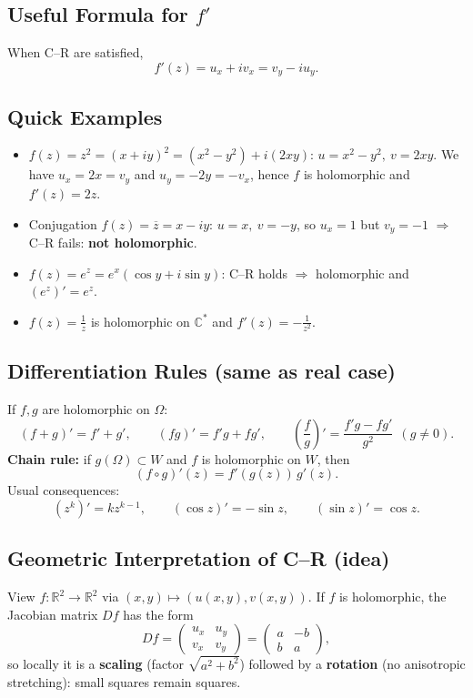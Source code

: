\subsection{Useful Formula for $f'$}
When C--R are satisfied,
\[
\boxed{f'(z)=u_x+iv_x=v_y-iu_y.}
\]

\subsection{Quick Examples}
\begin{itemize}
\item $f(z)=z^2=(x+iy)^2=(x^2-y^2)+i(2xy)$:
$u=x^2-y^2,\ v=2xy$.
We have $u_x=2x=v_y$ and $u_y=-2y=-v_x$, hence $f$ is holomorphic and $f'(z)=2z$.
\item Conjugation $f(z)=\overline{z}=x-iy$:
$u=x,\ v=-y$, so $u_x=1$ but $v_y=-1$ $\Rightarrow$ C--R fails:
\textbf{not holomorphic}.
\item $f(z)=e^z=e^x(\cos y+i\sin y)$: C--R holds $\Rightarrow$ holomorphic and $(e^z)'=e^z$.
\item $f(z)=\frac{1}{z}$ is holomorphic on $\mathbb{C}^\ast$ and $f'(z)=-\frac{1}{z^2}$.
\end{itemize}

\subsection{Differentiation Rules (same as real case)}
If $f,g$ are holomorphic on $\Omega$:
\[
(f+g)'=f'+g',\qquad
(fg)'=f'g+fg',\qquad
\left(\frac{f}{g}\right)'=\frac{f'g-fg'}{g^2}\ \ (g\neq 0).
\]
\textbf{Chain rule:} if $g(\Omega)\subset W$ and $f$ is holomorphic on $W$, then
\[
(f\circ g)'(z)=f'(g(z))\,g'(z).
\]
Usual consequences:
\[
(z^k)'=kz^{k-1},\qquad (\cos z)'=-\sin z,\qquad (\sin z)'=\cos z.
\]

\subsection{Geometric Interpretation of C--R (idea)}
View $f:\mathbb{R}^2\to\mathbb{R}^2$ via $(x,y)\mapsto(u(x,y),v(x,y))$.
If $f$ is holomorphic, the Jacobian matrix $Df$ has the form
\[
Df=
\begin{pmatrix}
u_x & u_y\\
v_x & v_y
\end{pmatrix}
=
\begin{pmatrix}
a & -b\\
b & a
\end{pmatrix},
\]
so locally it is a \textbf{scaling} (factor $\sqrt{a^2+b^2}$) followed by a \textbf{rotation}
(no anisotropic stretching): small squares remain squares.

